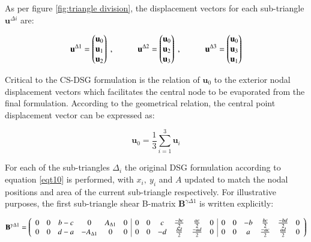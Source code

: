 As per figure \ref{fig:triangle division}, the displacement vectors for each sub-triangle $\mathbf{u}^{\Delta i}$ are:

\begin{equation} 
\mathbf{u}^{\Delta 1} = 
\begin{pmatrix}
\mathbf{u}_0 \\
\mathbf{u}_1 \\
\mathbf{u}_2
\end{pmatrix}
\ ,
\hspace{10mm}
\mathbf{u}^{\Delta 2} = 
\begin{pmatrix}
\mathbf{u}_0 \\
\mathbf{u}_2 \\
\mathbf{u}_3
\end{pmatrix}
\ ,
\hspace{10mm}
\mathbf{u}^{\Delta 3} = 
\begin{pmatrix}
\mathbf{u}_0 \\
\mathbf{u}_3 \\
\mathbf{u}_1
\end{pmatrix}
\label{eqCSDSG1}
\end{equation}

Critical to the CS-DSG formulation is the relation of $\mathbf{u}_0$ to the exterior nodal displacement vectors which facilitates the central node to be evaporated from the final formulation. According to the geometrical relation, the central point displacement vector can be expressed as:

 \begin{equation} 
\mathbf{u}_0
 =
 \frac{1}{3}
 \sum_{i=1}^3
\mathbf{u}_i
 \label{eqCSDSG2}
 \end{equation}
 
 For each of the sub-triangles $\Delta_i$ the original DSG formulation according to equation \ref{eqt10} is performed, with $x_i,\ y_i$ and $A$ updated to match the nodal positions and area of the current sub-triangle respectively. For illustrative purposes, the first sub-triangle shear B-matrix $\mathbf{B}^{\gamma\Delta 1}$ is written explicitly:
 
\begin{equation}
	\delimitershortfall=0pt
	\mathbf{B}^{\gamma\Delta 1} = 
		\left(\begin{array}{cccccc|cccccc|cccccc}
			0 & 0 & b-c & 0 & A_{\Delta 1} & 0 & 0 & 0 & c & \frac{-bc}{2} & \frac{ac}{2} & 0 & 0 & 0 & -b & \frac{bc}{2} & \frac{-bd}{2} & 0 \\
			0 & 0 & d-a & -A_{\Delta 1} & 0 & 0 & 0 & 0 & -d & \frac{bd}{2} & \frac{-ad}{2} & 0 & 0 & 0 & a & \frac{-ac}{2} & \frac{ad}{2} & 0
		\end{array}
	\right)
	 \label{eqCSDSG3}
\end{equation}

